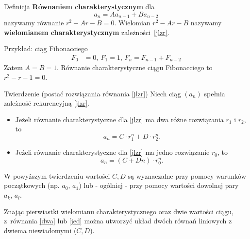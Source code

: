 \documentclass[a4paper,10pt]{beamer}
\begin{document}
\begin{frame}
	\begin{block}{Definicja}
		{\bf Równaniem charakterystycznym} dla $$a_n=Aa_{n-1}+Ba_{n-2}$$ nazywamy równanie $r^2-Ar-B=0$. Wielomian $r^2-Ar-B$ nazywamy {\bf wielomianem charakterystycznym} zależności~\eqref{jlzr}.
	\end{block}

	\begin{exampleblock}{Przykład: ciąg Fibonacciego}
		\begin{align*}
			F_0&=0,\ F_1=1,\,F_n=F_{n-1}+F_{n-2}
		\end{align*}
		Zatem $A=B=1$. Równanie charakterystyczne ciągu Fibonacciego to $r^2-r-1=0$.
	\end{exampleblock}
	
\end{frame}



\begin{frame}
	
	\begin{block}{Twierdzenie (postać rozwiązania równania \eqref{jlzr})}
		Niech ciąg $(a_n)$ spełnia zależność rekurencyjną \eqref{jlzr}.
		\begin{itemize}
			\item Jeżeli równanie charakterystyczne dla \eqref{jlzr} ma dwa różne rozwiązania $r_1$ i $r_2$, to \begin{equation}\label{dwa}a_n=C\cdot r_1^n+D\cdot r_2^n.\end{equation}
			\item Jeżeli równanie charakterystyczne dla \eqref{jlzr} ma jedno rozwiązanie $r_0$, to \begin{equation}\label{jed}a_n=(C+Dn)\cdot r_0^n.\end{equation}
		\end{itemize}
	\end{block}

	W powyższym twierdzeniu wartości $C,D$ są wyznaczalne przy pomocy warunków początkowych (np. $a_0,\,a_1$) lub - ogólniej - przy pomocy wartości dowolnej pary $a_k,\,a_l$. 
	
	Znając pierwiastki wielomianu charakterystycznego oraz dwie wartości ciągu, z~równania \eqref{dwa} lub \eqref{jed} można utworzyć układ dwóch równań liniowych z dwiema niewiadomymi ($C,D$).
	
\end{frame}
\end{document}
